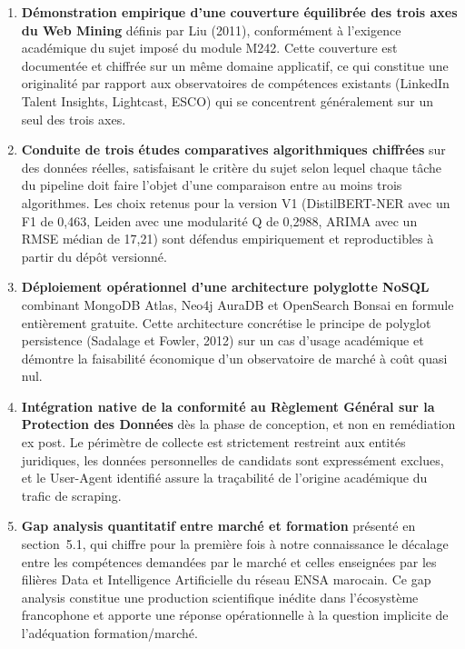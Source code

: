\documentclass[11pt,a4paper,openany]{report}
\begin{document}
\begin{enumerate}
  \item \textbf{D\'emonstration empirique d'une couverture \'equilibr\'ee des trois axes du Web Mining} d\'efinis par Liu (2011), conform\'ement \`a l'exigence acad\'emique du sujet impos\'e du module M242. Cette couverture est document\'ee et chiffr\'ee sur un m\^eme domaine applicatif, ce qui constitue une originalit\'e par rapport aux observatoires de comp\'etences existants (LinkedIn Talent Insights, Lightcast, ESCO) qui se concentrent g\'en\'eralement sur un seul des trois axes.

  \item \textbf{Conduite de trois \'etudes comparatives algorithmiques chiffr\'ees} sur des donn\'ees r\'eelles, satisfaisant le crit\`ere du sujet selon lequel chaque t\^ache du pipeline doit faire l'objet d'une comparaison entre au moins trois algorithmes. Les choix retenus pour la version V1 (DistilBERT-NER avec un F1 de 0,463, Leiden avec une modularit\'e Q de 0,2988, ARIMA avec un RMSE m\'edian de 17,21) sont d\'efendus empiriquement et reproductibles \`a partir du d\'ep\^ot versionn\'e.

  \item \textbf{D\'eploiement op\'erationnel d'une architecture polyglotte NoSQL} combinant MongoDB Atlas, Neo4j AuraDB et OpenSearch Bonsai en formule enti\`erement gratuite. Cette architecture concr\'etise le principe de polyglot persistence (Sadalage et Fowler, 2012) sur un cas d'usage acad\'emique et d\'emontre la faisabilit\'e \'economique d'un observatoire de march\'e \`a co\^ut quasi nul.

  \item \textbf{Int\'egration native de la conformit\'e au R\`eglement G\'en\'eral sur la Protection des Donn\'ees} d\`es la phase de conception, et non en rem\'ediation ex post. Le p\'erim\`etre de collecte est strictement restreint aux entit\'es juridiques, les donn\'ees personnelles de candidats sont express\'ement exclues, et le User-Agent identifi\'e assure la tra\c{c}abilit\'e de l'origine acad\'emique du trafic de scraping.

  \item \textbf{Gap analysis quantitatif entre march\'e et formation} pr\'esent\'e en section~5.1, qui chiffre pour la premi\`ere fois \`a notre connaissance le d\'ecalage entre les comp\'etences demand\'ees par le march\'e et celles enseign\'ees par les fili\`eres Data et Intelligence Artificielle du r\'eseau ENSA marocain. Ce gap analysis constitue une production scientifique in\'edite dans l'\'ecosyst\`eme francophone et apporte une r\'eponse op\'erationnelle \`a la question implicite de l'ad\'equation formation/march\'e.
\end{enumerate}
\end{document}
